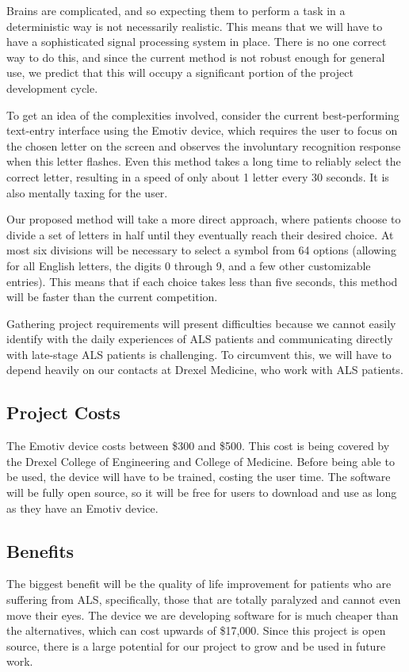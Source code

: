 \documentclass{report}
\begin{document}
Brains are complicated, and so expecting them to perform a task in a
deterministic way is not necessarily realistic. This means that we will have
to have a sophisticated signal processing system in place. There is no one
correct way to do this, and since the current method is not robust enough
for general use, we predict that this will occupy a significant portion of
the project development cycle.

To get an idea of the complexities involved, consider the current
best-performing text-entry interface using the Emotiv device, which requires
the user to focus on the chosen letter on the screen and observes the
involuntary recognition response when this letter flashes. Even this method
takes a long time to reliably select the correct letter, resulting in a speed
of only about 1 letter every 30 seconds. It is also mentally taxing for the
user. \cite{textentry}

Our proposed method will take a more direct approach, where patients choose
to divide a set of letters in half until they eventually reach their desired
choice. At most six divisions will be necessary to select a symbol from 64
options (allowing for all English letters, the digits 0 through 9, and a few
other customizable entries). This means that if each choice takes less than
five seconds, this method will be faster than the current competition.

Gathering project requirements will present difficulties because we cannot
easily identify with the daily experiences of ALS patients and communicating
directly with late-stage ALS patients is challenging. To circumvent this, we
will have to depend heavily on our contacts at Drexel Medicine, who work
with ALS patients.

\subsection*{Project Costs}
The Emotiv device\cite{Emotiv} costs between \$300 and \$500. This cost is
being covered by the Drexel College of Engineering and College of Medicine.
Before being able to be used, the device will have to be trained, costing the
user time. The software will be fully open source, so it will be free for
users to download and use as long as they have an Emotiv device.

\subsection*{Benefits}
The biggest benefit will be the quality of life improvement for patients who
are suffering from ALS, specifically, those that are totally paralyzed and
cannot even move their eyes. The device we are developing software for is
much cheaper than the alternatives, which can cost upwards of \$17,000.
Since this project is open source, there is a large potential for our
project to grow and be used in future work.
\end{document}
